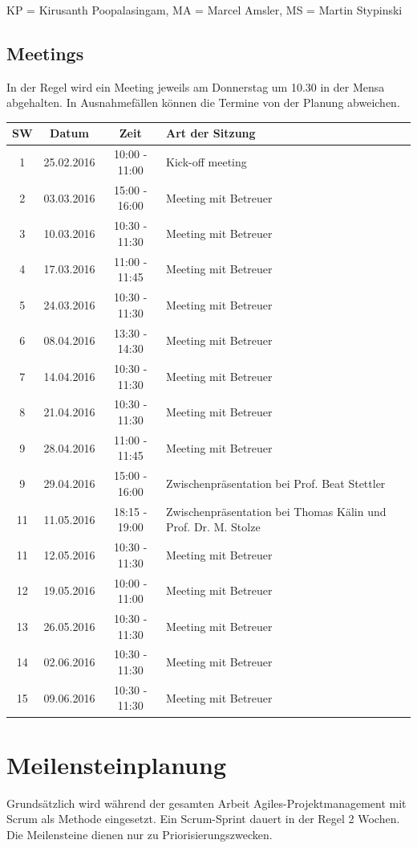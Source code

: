 KP = Kirusanth Poopalasingam, MA = Marcel Amsler, MS = Martin Stypinski
\newpage


\subsection{Meetings}
In der Regel wird ein Meeting jeweils am Donnerstag um 10.30 in der Mensa abgehalten. In Ausnahmefällen können die Termine von der Planung abweichen.
  \\[1\normalbaselineskip]
\begin{tabularx}{\textwidth}{|c|c|c|X|}
  \hline
  \textbf{SW} & \textbf{Datum} & \textbf{Zeit} & \textbf{Art der Sitzung} \\
  \hline \hline
  1 & 25.02.2016 & 10:00 - 11:00 &  Kick-off meeting \\
  2 & 03.03.2016 & 15:00 - 16:00 &  Meeting mit Betreuer \\
  3 & 10.03.2016 & 10:30 - 11:30 &  Meeting mit Betreuer \\
  4 & 17.03.2016 & 11:00 - 11:45 &  Meeting mit Betreuer \\
  5 & 24.03.2016 & 10:30 - 11:30 &  Meeting mit Betreuer \\
  6 & 08.04.2016 & 13:30 - 14:30 &  Meeting mit Betreuer \\
  7 & 14.04.2016 & 10:30 - 11:30 &  Meeting mit Betreuer \\
  8 & 21.04.2016 & 10:30 - 11:30 &  Meeting mit Betreuer \\
  9 & 28.04.2016 & 11:00 - 11:45 &  Meeting mit Betreuer \\
  9 & 29.04.2016 & 15:00 - 16:00 &  Zwischenpräsentation bei Prof. Beat Stettler \\
  11 & 11.05.2016 & 18:15 - 19:00 &  Zwischenpräsentation bei Thomas Kälin und Prof. Dr. M. Stolze \\
  11 & 12.05.2016 & 10:30 - 11:30 &  Meeting mit Betreuer \\
  12 & 19.05.2016 & 10:00 - 11:00 &  Meeting mit Betreuer \\
  13 & 26.05.2016 & 10:30 - 11:30 &  Meeting mit Betreuer \\
  14 & 02.06.2016 & 10:30 - 11:30 &  Meeting mit Betreuer \\
  15 & 09.06.2016 & 10:30 - 11:30 &  Meeting mit Betreuer \\
  \hline
\end{tabularx}
\newpage
\section{Meilensteinplanung}
Grundsätzlich wird während der gesamten Arbeit Agiles-Projektmanagement mit Scrum als Methode eingesetzt. Ein Scrum-Sprint dauert in der Regel 2 Wochen. Die Meilensteine dienen nur zu Priorisierungszwecken.

